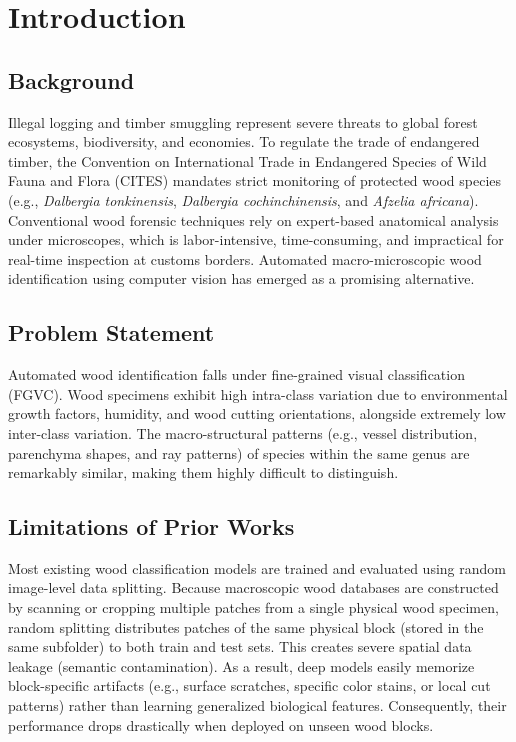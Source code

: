 \documentclass[journal,onecolumn]{IEEEtran}
\begin{document}
\section{Introduction}

\subsection{Background}
Illegal logging and timber smuggling represent severe threats to global forest ecosystems, biodiversity, and economies. To regulate the trade of endangered timber, the Convention on International Trade in Endangered Species of Wild Fauna and Flora (CITES) mandates strict monitoring of protected wood species (e.g., \textit{Dalbergia tonkinensis}, \textit{Dalbergia cochinchinensis}, and \textit{Afzelia africana}). Conventional wood forensic techniques rely on expert-based anatomical analysis under microscopes, which is labor-intensive, time-consuming, and impractical for real-time inspection at customs borders. Automated macro-microscopic wood identification using computer vision has emerged as a promising alternative.

\subsection{Problem Statement}
Automated wood identification falls under fine-grained visual classification (FGVC). Wood specimens exhibit high intra-class variation due to environmental growth factors, humidity, and wood cutting orientations, alongside extremely low inter-class variation. The macro-structural patterns (e.g., vessel distribution, parenchyma shapes, and ray patterns) of species within the same genus are remarkably similar, making them highly difficult to distinguish.

\subsection{Limitations of Prior Works}
Most existing wood classification models are trained and evaluated using random image-level data splitting. Because macroscopic wood databases are constructed by scanning or cropping multiple patches from a single physical wood specimen, random splitting distributes patches of the same physical block (stored in the same subfolder) to both train and test sets. This creates severe spatial data leakage (semantic contamination). As a result, deep models easily memorize block-specific artifacts (e.g., surface scratches, specific color stains, or local cut patterns) rather than learning generalized biological features. Consequently, their performance drops drastically when deployed on unseen wood blocks.
\end{document}
